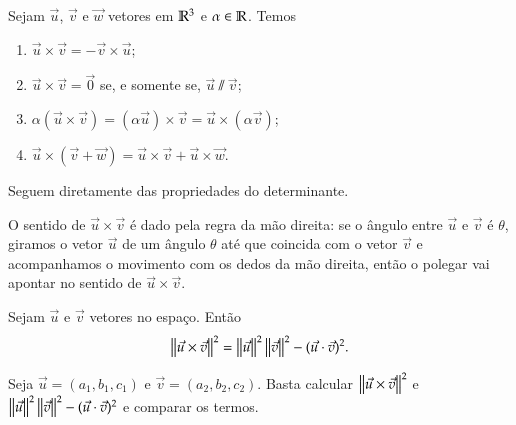 \begin{proposicao}
  Sejam $\vec{u}$, $\vec{v}$ e $\vec{w}$ vetores em $\mathbb{R}^3$ e $\alpha \in \mathbb{R}$. Temos
  \begin{enumerate}[label=({\alph*})]
    \item $\vec{u}\times\vec{v} = -\vec{v}\times\vec{u}$;
    \item $\vec{u}\times\vec{v} = \vec{0}$ se, e somente se, $\vec{u}\varparallel\vec{v}$;
    \item $\alpha(\vec{u}\times\vec{v}) = (\alpha\vec{u})\times\vec{v} = \vec{u}\times(\alpha\vec{v})$;
    \item $\vec{u}\times(\vec{v} + \vec{w}) = \vec{u}\times\vec{v} + \vec{u}\times\vec{w}$.
  \end{enumerate}
\end{proposicao}
\begin{prova}
  Seguem diretamente das propriedades do determinante.
\end{prova}

\begin{observacao}
  O sentido de $\vec{u}\times\vec{v}$ \'e dado pela regra da m\~ao direita: se o \^angulo entre $\vec{u}$ e $\vec{v}$ \'e $\theta$, giramos o vetor $\vec{u}$ de um \^angulo $\theta$ at\'e que coincida com o vetor $\vec{v}$ e acompanhamos o movimento com os dedos da m\~ao direita, ent\~ao o polegar vai apontar no sentido de $\vec{u}\times\vec{v}$.
\end{observacao}

\begin{proposicao}\label{normaprodutovetorial}
  Sejam $\vec{u}$ e $\vec{v}$ vetores no espa\c{c}o. Ent\~ao
  \begin{equation}
    \left\Vert{\vec{u}\times\vec{v}}\right\Vert^2 = \left\Vert{\vec{u}}\right\Vert^2\left\Vert{\vec{v}}\right\Vert^2 - (\vec{u}\cdot\vec{v})^2.
  \end{equation}
\end{proposicao}
\begin{prova}
  Seja $\vec{u} = (a_1,b_1,c_1)$ e $\vec{v} = (a_2,b_2,c_2)$. Basta calcular $\left\Vert{\vec{u}\times\vec{v}}\right\Vert^2$ e $\left\Vert{\vec{u}}\right\Vert^2\left\Vert{\vec{v}}\right\Vert^2 - (\vec{u}\cdot\vec{v})^2$  e comparar os termos.
\end{prova}


